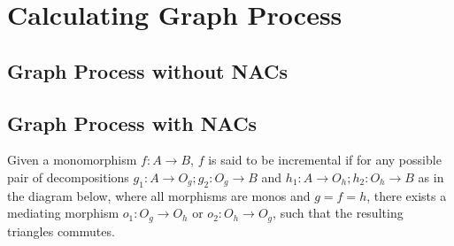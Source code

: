 \begin{definition}
\end{definition}

\section{Calculating Graph Process}

\subsection{Graph Process without NACs}

\begin{definition}
\end{definition}

\subsection{Graph Process with NACs}

\begin{definition} Given a monomorphism \mbox{$f : A \rightarrow B$}, $f$ is said to be incremental if for any possible pair of decompositions \mbox{$g_1 : A \rightarrow O_g;g_2 : O_g \rightarrow B$} and \mbox{$h_1 : A \rightarrow O_h;h_2 : O_h \rightarrow B$} as in the diagram below, where all morphisms are monos and $g = f = h$, there exists a mediating morphism $o_1 : O_g \rightarrow O_h$ or $o_2 : O_h \rightarrow O_g$, such that the resulting triangles commutes.



\end{definition}

\begin{example}
\end{example}

\begin{definition}
\end{definition}

